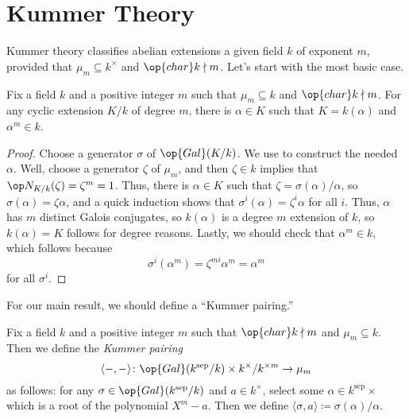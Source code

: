 \documentclass[notes.tex]{subfiles}
\begin{document}
\section{Kummer Theory}
Kummer theory classifies abelian extensions a given field $k$ of exponent $m$, provided that $\mu_m\subseteq k^\times$ and $\op{char}k\nmid m$. Let's start with the most basic case.
\begin{lemma} \label{lem:classify-cyclic-kummer}
	Fix a field $k$ and a positive integer $m$ such that $\mu_m\subseteq k$ and $\op{char}k\nmid m$. For any cyclic extension $K/k$ of degree $m$, there is $\alpha\in K$ such that $K=k(\alpha)$ and $\alpha^m\in k$.
\end{lemma}
\begin{proof}
	Choose a generator $\sigma$ of $\op{Gal}(K/k)$. We use  to construct the needed $\alpha$. Well, choose a generator $\zeta$ of $\mu_m$, and then $\zeta\in k$ implies that $\op N_{K/k}(\zeta)=\zeta^m=1$. Thus, there is $\alpha\in K$ such that $\zeta=\sigma(\alpha)/\alpha$, so $\sigma(\alpha)=\zeta\alpha$, and a quick induction shows that $\sigma^i(\alpha)=\zeta^i\alpha$ for all $i$. Thus, $\alpha$ has $m$ distinct Galois conjugates, so $k(\alpha)$ is a degree $m$ extension of $k$, so $k(\alpha)=K$ follows for degree reasons. Lastly, we should check that $\alpha^m\in k$, which follows because
	\[\sigma^i\left(\alpha^m\right)=\zeta^{mi}\alpha^m=\alpha^m\]
	for all $\sigma^i$.
\end{proof}
For our main result, we should define a ``Kummer pairing.''
\begin{definition}
	Fix a field $k$ and a positive integer $m$ such that $\op{char}k\nmid m$ and $\mu_m\subseteq k$.
	Then we define the \textit{Kummer pairing}
	\[\langle-,-\rangle\colon\op{Gal}(k^{\mathrm{sep}}/k)\times k^\times/k^{\times m}\to\mu_m\]
	as follows: for any $\sigma\in\op{Gal}(k^{\mathrm{sep}}/k)$ and $a\in k^\times$, select some $\alpha\in k^{\mathrm{sep}}\times$ which is a root of the polynomial $X^m-a$. Then we define $\langle\sigma,a\rangle\coloneqq\sigma(\alpha)/\alpha$.
\end{definition}
\end{document}
